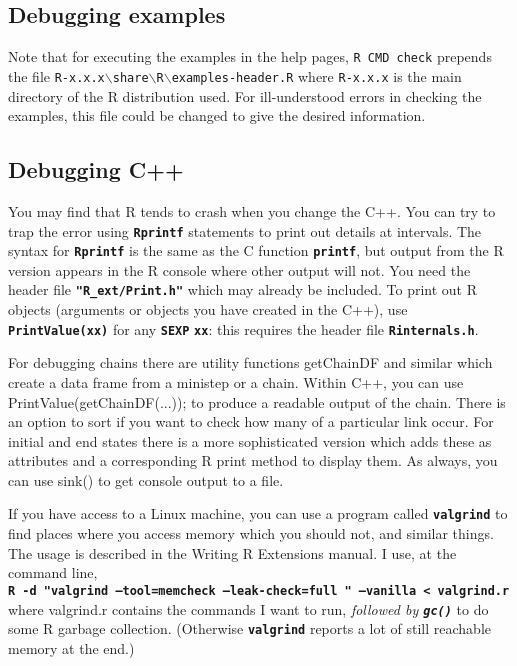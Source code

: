 \documentclass[12pt, a4paper]{article}
\renewcommand{\=}{\,=\,}
\newcommand{\+}{\,+\,}
\newcommand{\sfn}[1]{\textbf{\texttt{#1}}}
\begin{document}
\subsection{Debugging examples}
Note that for executing the examples in the help pages,
\texttt{R CMD check} prepends the file
\texttt{R-x.x.x$\backslash$share$\backslash$R$\backslash$examples-header.R} where \texttt{R-x.x.x}
is the main directory of the R distribution used.
For ill-understood errors in checking the examples,
this file could be changed to give the desired information.

\subsection{Debugging C++}
You may find that R tends to crash when you change the C++. You can try to trap
the error using \sfn{Rprintf} statements to print out details at intervals. The
syntax for \sfn{Rprintf} is the same as the C function \sfn{printf}, but output
from the R version appears in the R console where other output will not. You
need the header file \sfn{"R\_ext/Print.h"} which may already be included. To
print out R objects (arguments or objects you have created in the C++), use
\sfn{PrintValue(xx)} for any \sfn{SEXP} \sfn{xx}: this requires the header file
\sfn{Rinternals.h}.

For debugging chains there are utility functions \textsf{getChainDF} and similar
which create a data frame from a ministep or a chain. Within C++, you can use
\textsf{PrintValue(getChainDF(...));} to produce a readable output of the
chain. There is an option to sort if you want to check how many of a particular
link occur. For initial and end states there is a more sophisticated version
which adds these as attributes and a corresponding R print method to display
them. As always, you can use sink() to get console output to a file.

If you have access to a Linux machine, you can use a program called
\sfn{valgrind} to find places where you access memory which you should not, and
similar things. The usage is described in the Writing R Extensions manual. I
use, at the command line,\\
\sfn{R -d "valgrind --tool=memcheck --leak-check=full " --vanilla < valgrind.r}
\\
where valgrind.r contains the commands I want to run, \emph{followed by
  \sfn{gc()}} to do some R garbage collection. (Otherwise \sfn{valgrind} reports
a lot of still reachable memory at the end.)
\end{document}
